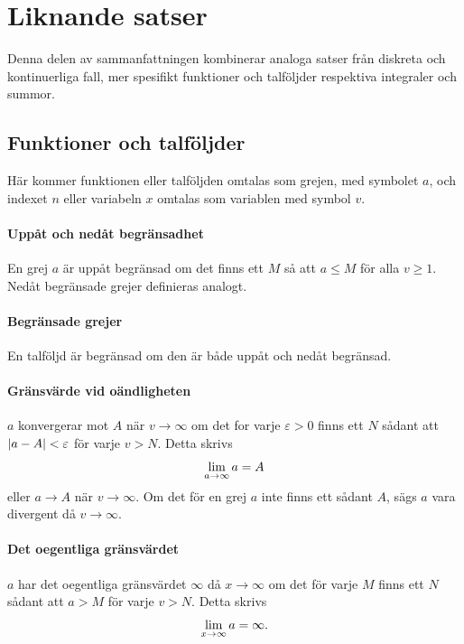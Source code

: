 \section{Liknande satser}
Denna delen av sammanfattningen kombinerar analoga satser från diskreta och kontinuerliga fall, mer spesifikt funktioner och talföljder respektiva integraler och summor.

\subsection{Funktioner och talföljder}
Här kommer funktionen eller talföljden omtalas som grejen, med symbolet $a$, och indexet $n$ eller variabeln $x$ omtalas som variablen med symbol $v$.

\paragraph{Uppåt och nedåt begränsadhet}
En grej $a$ är uppåt begränsad om det finns ett $M$ så att $a\leq M$ för alla $v \geq 1$. Nedåt begränsade grejer definieras analogt.

\paragraph{Begränsade grejer}
En talföljd är begränsad om den är både uppåt och nedåt begränsad.

\paragraph{Gränsvärde vid oändligheten}
$a$ konvergerar mot $A$ när $v\to\infty$ om det for varje $\varepsilon > 0$ finns ett $N$ sådant att $\abs{a - A} < \varepsilon$ för varje $v > N$. Detta skrivs
\begin{align*}
	\lim\limits_{a\to \infty}a = A
\end{align*}
eller $a\to A$ när $v\to\infty$. Om det för en grej $a$ inte finns ett sådant $A$, sägs $a$ vara divergent då $v\to\infty$.

\paragraph{Det oegentliga gränsvärdet}
$a$ har det oegentliga gränsvärdet $\infty$ då $x\to\infty$ om det för varje $M$ finns ett $N$ sådant att $a > M$ för varje $v > N$. Detta skrivs
\begin{align*}
	\lim\limits_{x\to \infty}a = \infty.
\end{align*}

